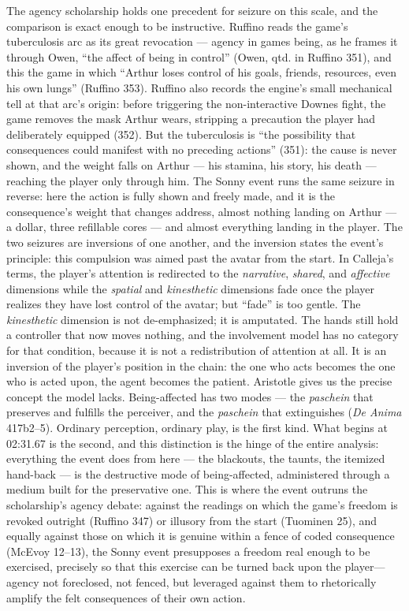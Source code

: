 \documentclass{article}
\begin{document}
The agency scholarship holds one precedent for seizure on this scale, and the comparison is exact enough to be instructive. Ruffino reads the game's tuberculosis arc as its great revocation — agency in games being, as he frames it through Owen, ``the affect of being in control'' (Owen, qtd. in Ruffino 351), and this the game in which ``Arthur loses control of his goals, friends, resources, even his own lungs'' (Ruffino 353). Ruffino also records the engine's small mechanical tell at that arc's origin: before triggering the non-interactive Downes fight, the game removes the mask Arthur wears, stripping a precaution the player had deliberately equipped (352). But the tuberculosis is ``the possibility that consequences could manifest with no preceding actions'' (351): the cause is never shown, and the weight falls on Arthur — his stamina, his story, his death — reaching the player only through him. The Sonny event runs the same seizure in reverse: here the action is fully shown and freely made, and it is the consequence's weight that changes address, almost nothing landing on Arthur — a dollar, three refillable cores — and almost everything landing in the player. The two seizures are inversions of one another, and the inversion states the event's principle: this compulsion was aimed past the avatar from the start. In Calleja's terms, the player's attention is redirected to the \textit{narrative}, \textit{shared}, and \textit{affective} dimensions while the \textit{spatial} and \textit{kinesthetic} dimensions fade once the player realizes they have lost control of the avatar; but ``fade'' is too gentle. The \textit{kinesthetic} dimension is not de-emphasized; it is amputated. The hands still hold a controller that now moves nothing, and the involvement model has no category for that condition, because it is not a redistribution of attention at all. It is an inversion of the player's position in the chain: the one who acts becomes the one who is acted upon, the agent becomes the patient. Aristotle gives us the precise concept the model lacks. Being-affected has two modes --- the \textit{paschein} that preserves and fulfills the perceiver, and the \textit{paschein} that extinguishes (\textit{De Anima} 417b2--5). Ordinary perception, ordinary play, is the first kind. What begins at 02:31.67 is the second, and this distinction is the hinge of the entire analysis: everything the event does from here --- the blackouts, the taunts, the itemized hand-back --- is the destructive mode of being-affected, administered through a medium built for the preservative one.
This is where the event outruns the scholarship's agency debate: against the readings on which the game's freedom is revoked outright (Ruffino 347) or illusory from the start (Tuominen 25), and equally against those on which it is genuine within a fence of coded consequence (McEvoy 12--13), the Sonny event presupposes a freedom real enough to be exercised, precisely so that this exercise can be turned back upon the player---agency not foreclosed, not fenced, but leveraged against them to rhetorically amplify the felt consequences of their own action.
\end{document}
